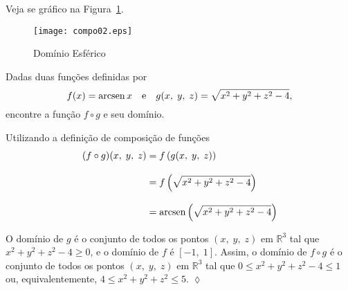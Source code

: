 Veja se gráfico na Figura~\ref{comp_02}.
\begin{figure}[H]
	\centering
	\texttt{[image: compo02.eps]}
	\caption{Domínio Esférico}
	\label{comp_02}
\end{figure}

\begin{exer}
	Dadas duas funções definidas por
	\begin{equation*}
		f(x) = \operatorname{arcsen} x \quad \textrm{e}\quad  g(x,\; y,\; z) = \sqrt{x^{2}+y^{2}+z^{2}-4},
	\end{equation*} 
	encontre a função \(f\circ g\) e seu domínio.
\end{exer}

\solo
Utilizando a definição de composição de funções
\begin{align*}
	(f\circ g)(x,\; y, \; z)&= f\left(g(x,\; y,\; z)\right)\\[2ex]
	& = f\left(\sqrt{x^{2}+y^{2}+z^{2}-4}\right)\\[2ex]
	& = \operatorname{arcsen}\left(\sqrt{x^{2}+y^{2}+z^{2}-4}\right)
\end{align*}

O domínio de \(g\) é o conjunto de todos os pontos \((x,\; y,\; z)\) em \(\mathbb{R}^{3}\) tal que \(x^{2}+y^{2}+z^{2}-4 \geq  0\), e o domínio de \(f\) é 
\([-1,\; 1]\). Assim, o domínio de \(f \circ g\) é o conjunto de todos os pontos \((x,\; y,\; z)\) em \(\mathbb{R}^{3}\) tal que 
\(0 \leq  x^{2}+y^{2}+z^{2}-4 \leq 1\) ou, equivalentemente, \(4 \leq  x^{2}+y^{2}+z^{2} \leq  5\). \hfill \(\lozenge\)

